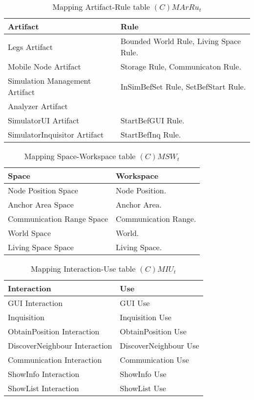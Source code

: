 \begin{table}[H]
	\centering
	\begin{tabular}{|p{4cm}|p{8cm}|}
			\hline
			\textbf{Artifact} & \textbf{Rule} \\
			\hline
			Legs Artifact & Bounded World Rule, Living Space Rule. \\
			\hline
			Mobile Node Artifact & Storage Rule, Communicaton Rule. \\
			\hline
			Simulation Management Artifact & InSimBefSet Rule, SetBefStart Rule. \\
			\hline
			Analyzer Artifact & \\
			\hline
			SimulatorUI Artifact & StartBefGUI Rule. \\
			\hline
			SimulatorInquisitor Artifact & StartBefInq Rule. \\
			\hline
		\end{tabular}
	\caption{Mapping Artifact-Rule table $(C)MArRu_t$}
	\label{tab:cmarrut}
\end{table}

\begin{table}[H]
	\centering
	\begin{tabular}{|p{4cm}|p{8cm}|}
			\hline
			\textbf{Space} & \textbf{Workspace} \\
			\hline
			Node Position Space & Node Position. \\
			\hline
			Anchor Area Space & Anchor Area. \\
			\hline
			Communication Range Space & Communication Range.\\
			\hline
			World Space & World. \\
			\hline
			Living Space Space & Living Space. \\
			\hline
		\end{tabular}
	\caption{Mapping Space-Workspace table $(C)MSW_t$}
	\label{tab:cmsrt}
\end{table}

\begin{table}[H]
	\centering
	\begin{tabular}{|p{4cm}|p{8cm}|}
			\hline
			\textbf{Interaction} & \textbf{Use} \\
			\hline
			GUI Interaction & GUI Use \\
			\hline
			Inquisition & Inquisition Use \\
			\hline
			ObtainPosition Interaction & ObtainPosition Use \\	
			\hline
			DiscoverNeighbour Interaction & DiscoverNeighbour Use \\	
			\hline
			Communication Interaction & Communication Use \\	
			\hline
			ShowInfo Interaction & ShowInfo Use \\
			\hline
			ShowList Interaction & ShowList Use \\
			\hline
		\end{tabular}
	\caption{Mapping Interaction-Use table $(C)MIU_t$}
	\label{tab:cmiut}
\end{table}

